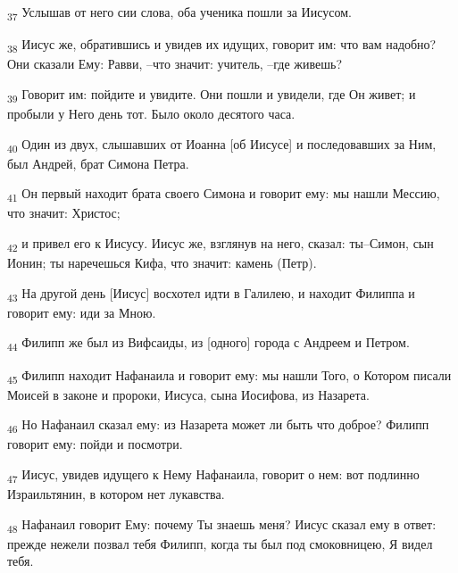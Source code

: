 \begin{tcolorbox}
\textsubscript{37} Услышав от него сии слова, оба ученика пошли за Иисусом.
\end{tcolorbox}
\begin{tcolorbox}
\textsubscript{38} Иисус же, обратившись и увидев их идущих, говорит им: что вам надобно? Они сказали Ему: Равви, --что значит: учитель, --где живешь?
\end{tcolorbox}
\begin{tcolorbox}
\textsubscript{39} Говорит им: пойдите и увидите. Они пошли и увидели, где Он живет; и пробыли у Него день тот. Было около десятого часа.
\end{tcolorbox}
\begin{tcolorbox}
\textsubscript{40} Один из двух, слышавших от Иоанна [об Иисусе] и последовавших за Ним, был Андрей, брат Симона Петра.
\end{tcolorbox}
\begin{tcolorbox}
\textsubscript{41} Он первый находит брата своего Симона и говорит ему: мы нашли Мессию, что значит: Христос;
\end{tcolorbox}
\begin{tcolorbox}
\textsubscript{42} и привел его к Иисусу. Иисус же, взглянув на него, сказал: ты--Симон, сын Ионин; ты наречешься Кифа, что значит: камень (Петр).
\end{tcolorbox}
\begin{tcolorbox}
\textsubscript{43} На другой день [Иисус] восхотел идти в Галилею, и находит Филиппа и говорит ему: иди за Мною.
\end{tcolorbox}
\begin{tcolorbox}
\textsubscript{44} Филипп же был из Вифсаиды, из [одного] города с Андреем и Петром.
\end{tcolorbox}
\begin{tcolorbox}
\textsubscript{45} Филипп находит Нафанаила и говорит ему: мы нашли Того, о Котором писали Моисей в законе и пророки, Иисуса, сына Иосифова, из Назарета.
\end{tcolorbox}
\begin{tcolorbox}
\textsubscript{46} Но Нафанаил сказал ему: из Назарета может ли быть что доброе? Филипп говорит ему: пойди и посмотри.
\end{tcolorbox}
\begin{tcolorbox}
\textsubscript{47} Иисус, увидев идущего к Нему Нафанаила, говорит о нем: вот подлинно Израильтянин, в котором нет лукавства.
\end{tcolorbox}
\begin{tcolorbox}
\textsubscript{48} Нафанаил говорит Ему: почему Ты знаешь меня? Иисус сказал ему в ответ: прежде нежели позвал тебя Филипп, когда ты был под смоковницею, Я видел тебя.
\end{tcolorbox}
